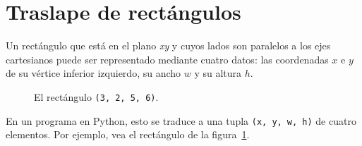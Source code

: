 \section{Traslape de rectángulos}

Un rectángulo que está en el plano \emph{xy} y cuyos lados son paralelos a
los ejes cartesianos puede ser representado mediante cuatro datos:
las coordenadas \(x\) e \(y\) de su vértice inferior izquierdo,
su ancho \(w\) y su altura \(h\).

\begin{figure}
  \centering
  
  \caption{El rectángulo \lstinline!(3, 2, 5, 6)!.}
  \label{fig:rect1}
\end{figure}

En un programa en Python, esto se traduce a una tupla
\lstinline!(x, y, w, h)! de cuatro elementos.
Por ejemplo, vea el rectángulo de la figura~\ref{fig:rect1}.

